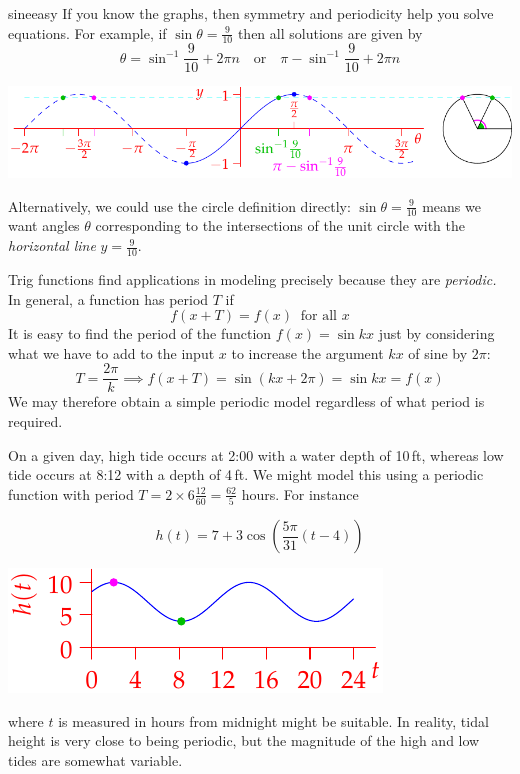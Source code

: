 \begin{example}{}{sineeasy}
	If you know the graphs, then symmetry and periodicity help you solve equations. For example, if $\sin \theta=\frac 9{10}$ then all solutions are given by
	\[
		\theta=\sin^{-1}\frac 9{10}+2\pi n
		\quad\text{or}\quad 
		\pi-\sin^{-1}\frac 9{10}+2\pi n \tag{$n$ is any integer}
	\]
	\begin{center}
		\includegraphics[scale=0.95]{invsine3}
	\end{center}
	Alternatively, we could use the circle definition directly: $\sin\theta=\frac 9{10}$ means we want angles $\theta$ corresponding to the intersections of the unit circle with the \emph{horizontal line} $y=\frac 9{10}$.
\end{example}


\goodbreak



Trig functions find applications in modeling precisely because they are \emph{periodic.} In general, a function has period $T$ if
\[
	f(x+T)=f(x)\ \text{ for all $x$}
\]
It is easy to find the period of the function $f(x)=\sin kx$ just by considering what we have to add to the input $x$ to increase the argument $kx$ of sine by $2\pi$:
\[
	T=\frac{2\pi}k\implies f(x+T)=\sin(kx+2\pi)=\sin kx=f(x)
\]
We may therefore obtain a simple periodic model regardless of what period is required.

\begin{example}{}{}
	On a given day, high tide occurs at 2:00 with a water depth of 10\,ft, whereas low tide occurs at 8:12 with a depth of 4\,ft. We might model this using a periodic function with period $T=2\times 6\frac{12}{60}=\frac{62}{5}$ hours. For instance\par
	\begin{minipage}[t]{0.6\linewidth}\vspace{-8pt}
		\[
			h(t)=7+3\cos\left(\frac{5\pi}{31}(t-4)\right)
		\] 
	\end{minipage}
	\hfill
	\begin{minipage}[t]{0.39\linewidth}\vspace{-18pt}
		\flushright\includegraphics{tide}
	\end{minipage}\medbreak
	where $t$ is measured in hours from midnight might be suitable. In reality, tidal height is very close to being periodic, but the magnitude of the high and low tides are somewhat variable.
\end{example}


